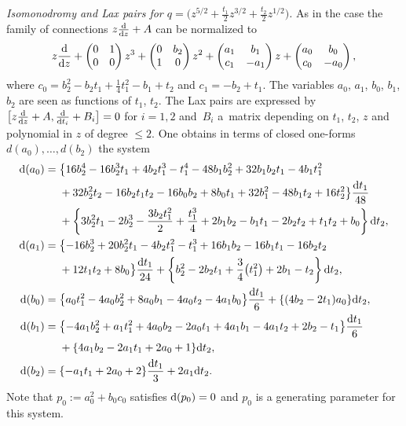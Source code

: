 \documentclass[pdftex]{sigma}
\numberwithin{equation}{section}
\begin{document}
{\it Isomonodromy and Lax pairs for $q=\bigl(z^{5/2}+\frac{t_1}{2}z^{3/2}+\frac{t_2}{2}z^{1/2}\bigr)$.}
As in the case  the family of connections $z\frac{{\rm d}}{{\rm d}z}+A$ can be normalized to
\[ z\frac{{\rm d}}{{\rm d}z}+ \begin{pmatrix} 0 & 1 \\ 0& 0\end{pmatrix} z^3+
\begin{pmatrix} 0 & b_2 \\ 1& 0\end{pmatrix} z^2+
\begin{pmatrix} a_1 &b_1 \\ c_1& -a_1\end{pmatrix} z+ \begin{pmatrix} a_0 & b_0
 \\ c_0& -a_0\end{pmatrix},\]
where $c_0=b_2^2-b_2t_1+\frac{1}{4}t_1^2-b_1+t_2$ and $c_1=-b_2+t_1$.
The variables $a_0$, $a_1$, $b_0$, $b_1$, $b_2$ are seen as functions of $t_1$, $t_2$. The Lax pairs are expressed
by $\bigl[z\frac{{\rm d}}{{\rm d}z}+A, \frac{{\rm d}}{{\rm d}t_i}+B_i\bigr]=0$ for $i=1,2$ and~$B_i$ a~matrix depending on $t_1$, $t_2$, $z$ and polynomial in $z$
of degree $\leq 2$. One obtains in terms of closed one-forms $d(a_0),\dots ,d(b_2)$ the system
\begin{align*}
{\rm d}(a_0)={} &\bigl\{16b_2^4-16b_2^3t_1+4b_2t_1^3-t_1^4-48b_1b_2^2+32b_1b_2t_1-4b_1t_1^2\\
&+32b_2^2t_2-16b_2t_1t_2-16b_0b_2+
 8b_0t_1+32b_1^2-48b_1t_2+16t_2^2 \bigr\} \frac{{\rm d}t_1}{48} \\
 & +\left\{3b_2^2t_1 -2b_2^3 -\frac{3b_2t_1^2}{2}+\frac{t_1^3}{4}+2b_1b_2 -b_1t_1 -2b_2t_2+t_1t_2+b_0 \right\} {\rm d}t_2, \\
{\rm d}(a_1)={} &\bigl\{
 -16b_2^3+20b_2^2t_1-4b_2t_1^2-t_1^3+16b_1b_2-16b_1t_1-16b_2t_2\\ &+12t_1t_2+8b_0\bigr\}\frac{{\rm d}t_1}{24} +
 \left\{b_2^2-2b_2t_1+\frac{3}{4}\bigl(t_1^2\bigr)+2b_1-t_2 \right\} {\rm d}t_2, \\
{\rm d}(b_0)={} &\bigl\{a_0t_1^2-4a_0b_2^2+8a_0b_1-4a_0t_2-4a_1b_0\bigr\}\frac{{\rm d}t_1}{6}+\{ (4b_2-2t_1)a_0 \}{\rm d}t_2, \\
{\rm d}(b_1)={} &\bigl\{ -4a_1b_2^2+a_1t_1^2+4a_0b_2-2a_0t_1+4a_1b_1-4a_1t_2+2b_2-t_1\bigr\} \frac{{\rm d}t_1}{6}\\
 &+\{ 4a_1b_2-2a_1t_1+2a_0+1 \} {\rm d}t_2,\\
 {\rm d}(b_2)={} & \{ -a_1t_1+2a_0+2\}\frac{{\rm d}t_1}{3}+2a_1{\rm d}t_2.\end{align*}
Note that $p_0:=a_0^2+b_0c_0$ satisfies ${\rm d}(p_0)=0$ and $p_0$ is a generating parameter for this system.
\end{document}

